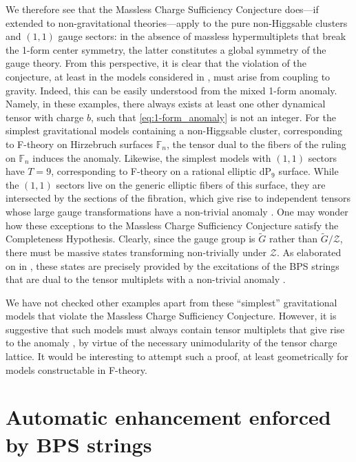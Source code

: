 \documentclass[11pt, a4paper]{article}
\newcommand*{\bbF}{\ensuremath{\mathbb{F}}}
\newcommand*{\cZ}{\ensuremath{\mathcal{Z}}}
\begin{document}
We therefore see that the Massless Charge Sufficiency Conjecture does---if extended to non-gravitational theories---apply to the pure non-Higgsable clusters and $(1,1)$ gauge sectors: in the absence of massless hypermultiplets that break the 1-form center symmetry, the latter constitutes a global symmetry of the gauge theory.
From this perspective, it is clear that the violation of the conjecture, at least in the models considered in \cite{Morrison:2021wuv}, must arise from coupling to gravity.
Indeed, this can be easily understood from the mixed 1-form anomaly.
Namely, in these examples, there always exists at least one other dynamical tensor with charge $b$, such that \cref{eq:1-form_anomaly} is not an integer.
For the simplest gravitational models containing a non-Higgsable cluster, corresponding to F-theory on Hirzebruch surfaces $\bbF_n$, the tensor dual to the fibers of the ruling on $\bbF_n$ induces the anomaly.
Likewise, the simplest models with $(1,1)$ sectors have $T=9$, corresponding to F-theory on a rational elliptic dP$_9$ surface.
While the $(1,1)$ sectors live on the generic elliptic fibers of this surface, they are intersected by the sections of the fibration, which give rise to independent tensors whose large gauge transformations have a non-trivial anomaly .
One may wonder how these exceptions to the Massless Charge Sufficiency Conjecture satisfy the Completeness Hypothesis.
Clearly, since the gauge group is $\widetilde{G}$ rather than $\widetilde{G}/\cZ$, there must be massive states transforming non-trivially under $\cZ$.
As elaborated on in \cite{Apruzzi:2020zot}, these states are precisely provided by the excitations of the BPS strings that are dual to the tensor multiplets with a non-trivial anomaly .

We have not checked other examples apart from these ``simplest'' gravitational models that violate the Massless Charge Sufficiency Conjecture.
However, it is suggestive that such models must always contain tensor multiplets that give rise to the anomaly , by virtue of the necessary unimodularity of the tensor charge lattice.
It would be interesting to attempt such a proof, at least geometrically for models constructable in F-theory.



\section{Automatic enhancement enforced by BPS strings}\label{sec:strings}
\end{document}
